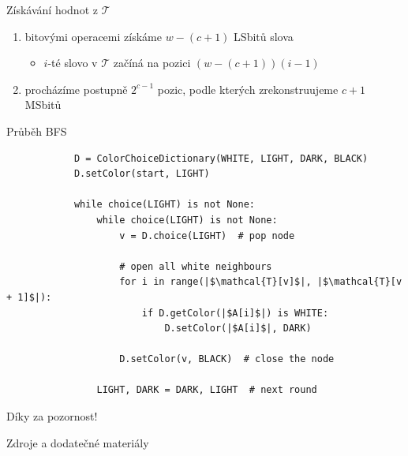 \documentclass[czech]{beamer}
\begin{document}
	\begin{frame}{Získávání hodnot z $\mathcal{T}$}
		\begin{enumerate}
			\item bitovými operacemi získáme $w - (c + 1)$ LSbitů slova
			\begin{itemize}
				\item $i$-té slovo v $\mathcal{T}$ začíná na pozici $(w - (c + 1))(i - 1)$
			\end{itemize}
			\item procházíme postupně $2^{c - 1}$ pozic, podle kterých zrekonstruujeme $c + 1$ MSbitů
		\end{enumerate}
	\end{frame}


	\begin{frame}[fragile]{Průběh BFS}
		\small
		\begin{verbatim}
			D = ColorChoiceDictionary(WHITE, LIGHT, DARK, BLACK)
			D.setColor(start, LIGHT)

			while choice(LIGHT) is not None:
				while choice(LIGHT) is not None:
					v = D.choice(LIGHT)  # pop node

					# open all white neighbours
					for i in range(|$\mathcal{T}[v]$|, |$\mathcal{T}[v + 1]$|):
						if D.getColor(|$A[i]$|) is WHITE:
							D.setColor(|$A[i]$|, DARK)

					D.setColor(v, BLACK)  # close the node

				LIGHT, DARK = DARK, LIGHT  # next round
		\end{verbatim}
	\end{frame}

	\begin{frame}[focus]
		Díky za pozornost!
	\end{frame}
	
	\appendix
	\begin{frame}{Zdroje a dodatečné materiály}
		\nocite{*}
		
		
	\end{frame}
\end{document}
